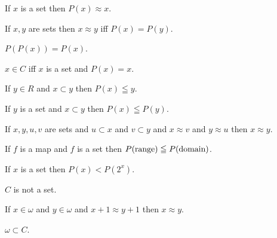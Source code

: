 \documentclass[a4paper,draft]{amsproc}
\begin{document}
\begin{forthel}
\begin{theorem}[153]
If $x$ is a set then $P(x) \approx x$.
\end{theorem}

\begin{theorem}[154]
If $x, y$ are sets then $x \approx y$ iff $P(x) = P(y)$.
\end{theorem}

\begin{theorem}[155]
$P(P(x)) = P(x)$.
\end{theorem}

\begin{theorem}[156]
$x \in C$ iff $x$ is a set and $P(x) = x$.
\end{theorem}

\begin{theorem}[157]
If $y \in R$ and $x \subset y$ then $P(x) \leqq y$.
\end{theorem}

\begin{theorem}[158]
If $y$ is a set and $x \subset y$ then $P(x) \leqq P(y)$.
\end{theorem}

\begin{theorem}[159]
If $x, y, u, v$ are sets and $u \subset x$ and $v \subset y$ and $x \approx v$ and $y \approx u$ then $x \approx y$.
\end{theorem}

\begin{theorem}[160]
If $f$ is a map and $f$ is a set then $P(\range f) \leqq P(\domain f)$.
\end{theorem}

\begin{theorem}[161]
If $x$ is a set then $P(x) < P(2^{x})$.
\end{theorem}

\begin{theorem}[162]
$C$ is not a set.
\end{theorem}

\begin{theorem}[163]
If $x \in \omega$ and $y \in \omega$ and $x + 1 \approx y + 1$ then $x \approx y$.
\end{theorem}

\begin{theorem}
$\omega \subset C$.
\end{theorem}


\end{forthel}
\end{document}
